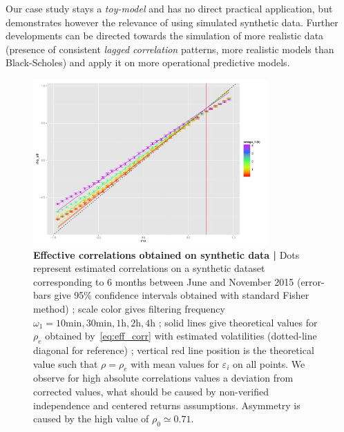 Our case study stays a \emph{toy-model} and has no direct practical application, but demonstrates however the relevance of using simulated synthetic data. Further developments can be directed towards the simulation of more realistic data (presence of consistent \emph{lagged correlation} patterns, more realistic models than Black-Scholes) and apply it on more operational predictive models.





\begin{figure}[h!]
\centering
\includegraphics[width=0.8\textwidth,height=0.3\textheight]{figures/effectiveCorrs_withGoodTh_A4}
\caption{\small\textbf{Effective correlations obtained on synthetic data | } Dots represent estimated correlations on a synthetic dataset corresponding to 6 months between June and November 2015 (error-bars give 95\% confidence intervals obtained with standard Fisher method) ; scale color gives filtering frequency $\omega_1=10\textrm{min},30\textrm{min},1\textrm{h},2\textrm{h},4\textrm{h}$ ; solid lines give theoretical values for $\rho_e$ obtained by~\ref{eq:eff_corr} with estimated volatilities (dotted-line diagonal for reference) ; vertical red line position is the theoretical value such that $\rho = \rho_e$ with mean values for $\varepsilon_i$ on all points. We observe for high absolute correlations values a deviation from corrected values, what should be caused by non-verified independence and centered returns assumptions. Asymmetry is caused by the high value of $\rho_0 \simeq 0.71$.}
\label{fig:effective_corrs}
\end{figure}


